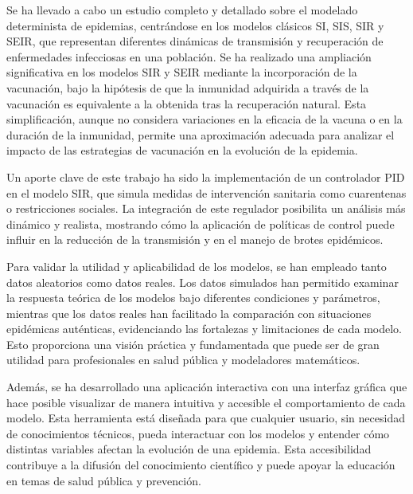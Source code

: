 Se ha llevado a cabo un estudio completo y detallado sobre el modelado determinista de epidemias, centrándose en los modelos clásicos SI, SIS, SIR y SEIR, que representan diferentes dinámicas de transmisión y recuperación de enfermedades infecciosas en una población. Se ha realizado una ampliación significativa en los modelos SIR y SEIR mediante la incorporación de la vacunación, bajo la hipótesis de que la inmunidad adquirida a través de la vacunación es equivalente a la obtenida tras la recuperación natural. Esta simplificación, aunque no considera variaciones en la eficacia de la vacuna o en la duración de la inmunidad, permite una aproximación adecuada para analizar el impacto de las estrategias de vacunación en la evolución de la epidemia.

Un aporte clave de este trabajo ha sido la implementación de un controlador PID en el modelo SIR, que simula medidas de intervención sanitaria como cuarentenas o restricciones sociales. La integración de este regulador posibilita un análisis más dinámico y realista, mostrando cómo la aplicación de políticas de control puede influir en la reducción de la transmisión y en el manejo de brotes epidémicos.

Para validar la utilidad y aplicabilidad de los modelos, se han empleado tanto datos aleatorios como datos reales. Los datos simulados han permitido examinar la respuesta teórica de los modelos bajo diferentes condiciones y parámetros, mientras que los datos reales han facilitado la comparación con situaciones epidémicas auténticas, evidenciando las fortalezas y limitaciones de cada modelo. Esto proporciona una visión práctica y fundamentada que puede ser de gran utilidad para profesionales en salud pública y modeladores matemáticos.

Además, se ha desarrollado una aplicación interactiva con una interfaz gráfica que hace posible visualizar de manera intuitiva y accesible el comportamiento de cada modelo. Esta herramienta está diseñada para que cualquier usuario, sin necesidad de conocimientos técnicos, pueda interactuar con los modelos y entender cómo distintas variables afectan la evolución de una epidemia. Esta accesibilidad contribuye a la difusión del conocimiento científico y puede apoyar la educación en temas de salud pública y prevención.


